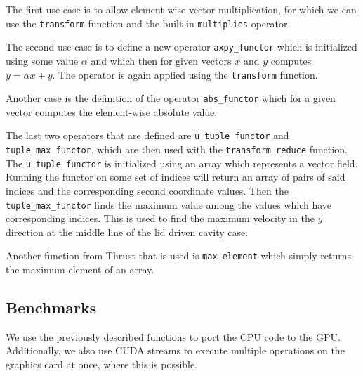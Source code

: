 \documentclass{article}
\begin{document}
The first use case is to allow element-wise vector multiplication, for which we can use 
the \verb|transform| function and the built-in \verb|multiplies| operator.

The second use case is to define a new operator \verb|axpy_functor| which is initialized using some 
value \(\alpha\) and which then for given vectors \(x\) and \(y\) computes \(y = \alpha x + y\).
The operator is again applied using the \verb|transform| function.

Another case is the definition of the operator \verb|abs_functor| which for a given vector 
computes the element-wise absolute value.

The last two operators that are defined are \verb|u_tuple_functor| and \verb|tuple_max_functor|,
which are then used with the \verb|transform_reduce| function. The \verb|u_tuple_functor| is initialized
using an array which represents a vector field. Running the functor on some set of indices
will return an array of pairs of said indices and the corresponding second coordinate values.
Then the \verb|tuple_max_functor| finds the maximum value among the values which have corresponding 
indices. This is used to find 
the maximum velocity in the \(y\) direction at the middle line of the lid driven cavity case.

Another function from Thrust that is used is \verb|max_element| which simply returns the 
maximum element of an array.
\subsection{Benchmarks}
We use the previously described functions to port the CPU code to the GPU. Additionally,
we also use CUDA streams to execute multiple operations on the graphics card at once, where 
this is possible. 
\end{document}
